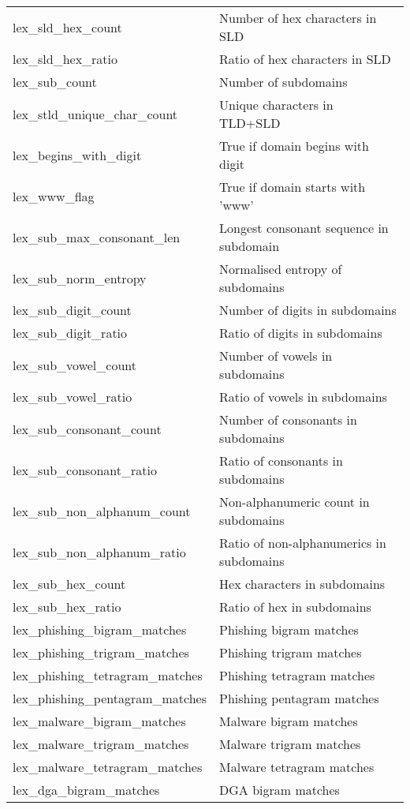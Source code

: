 \begin{longtable}{@{}ll@{}}
lex\_sld\_hex\_count & Number of hex characters in SLD \\
lex\_sld\_hex\_ratio & Ratio of hex characters in SLD \\
lex\_sub\_count & Number of subdomains \\
lex\_stld\_unique\_char\_count & Unique characters in TLD+SLD \\
lex\_begins\_with\_digit & True if domain begins with digit \\
lex\_www\_flag & True if domain starts with 'www' \\
lex\_sub\_max\_consonant\_len & Longest consonant sequence in subdomain \\
lex\_sub\_norm\_entropy & Normalised entropy of subdomains \\
lex\_sub\_digit\_count & Number of digits in subdomains \\
lex\_sub\_digit\_ratio & Ratio of digits in subdomains \\
lex\_sub\_vowel\_count & Number of vowels in subdomains \\
lex\_sub\_vowel\_ratio & Ratio of vowels in subdomains \\
lex\_sub\_consonant\_count & Number of consonants in subdomains \\
lex\_sub\_consonant\_ratio & Ratio of consonants in subdomains \\
lex\_sub\_non\_alphanum\_count & Non-alphanumeric count in subdomains \\
lex\_sub\_non\_alphanum\_ratio & Ratio of non-alphanumerics in subdomains \\
lex\_sub\_hex\_count & Hex characters in subdomains \\
lex\_sub\_hex\_ratio & Ratio of hex in subdomains \\
lex\_phishing\_bigram\_matches & Phishing bigram matches \\
lex\_phishing\_trigram\_matches & Phishing trigram matches \\
lex\_phishing\_tetragram\_matches & Phishing tetragram matches \\
lex\_phishing\_pentagram\_matches & Phishing pentagram matches \\
lex\_malware\_bigram\_matches & Malware bigram matches \\
lex\_malware\_trigram\_matches & Malware trigram matches \\
lex\_malware\_tetragram\_matches & Malware tetragram matches \\
lex\_dga\_bigram\_matches & DGA bigram matches \\

\end{longtable}
